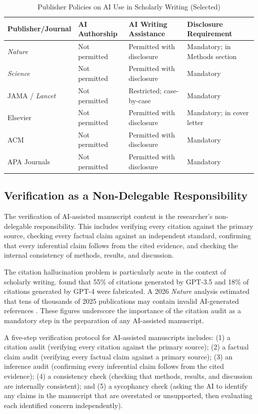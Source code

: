 \documentclass[12pt, a4paper]{article}
\begin{document}
\begin{table}[ht]
\centering
\caption{Publisher Policies on AI Use in Scholarly Writing (Selected)}
\label{tab:publishers}
\begin{tabularx}{\textwidth}{lllX}
\toprule
\textbf{Publisher/Journal} & \textbf{AI Authorship} & \textbf{AI Writing Assistance} & \textbf{Disclosure Requirement} \\
\midrule
\textit{Nature} & Not permitted & Permitted with disclosure & Mandatory; in Methods section \\
\textit{Science} & Not permitted & Permitted with disclosure & Mandatory \\
JAMA / \textit{Lancet} & Not permitted & Restricted; case-by-case & Mandatory \\
Elsevier & Not permitted & Permitted with disclosure & Mandatory; in cover letter \\
ACM & Not permitted & Permitted with disclosure & Mandatory \\
APA Journals & Not permitted & Permitted with disclosure & Mandatory \\
\bottomrule
\end{tabularx}
\end{table}

\subsection{Verification as a Non-Delegable Responsibility}

The verification of AI-assisted manuscript content is the researcher's non-delegable responsibility. This includes verifying every citation against the primary source, checking every factual claim against an independent standard, confirming that every inferential claim follows from the cited evidence, and checking the internal consistency of methods, results, and discussion.

The citation hallucination problem is particularly acute in the context of scholarly writing. \citet{walters2023fabrication} found that 55\% of citations generated by GPT-3.5 and 18\% of citations generated by GPT-4 were fabricated. A 2026 \textit{Nature} analysis estimated that tens of thousands of 2025 publications may contain invalid AI-generated references \citep{nature2026hallucination}. These figures underscore the importance of the citation audit as a mandatory step in the preparation of any AI-assisted manuscript.

A five-step verification protocol for AI-assisted manuscripts includes: (1) a citation audit (verifying every citation against the primary source); (2) a factual claim audit (verifying every factual claim against a primary source); (3) an inference audit (confirming every inferential claim follows from the cited evidence); (4) a consistency check (checking that methods, results, and discussion are internally consistent); and (5) a sycophancy check (asking the AI to identify any claims in the manuscript that are overstated or unsupported, then evaluating each identified concern independently).
\end{document}
